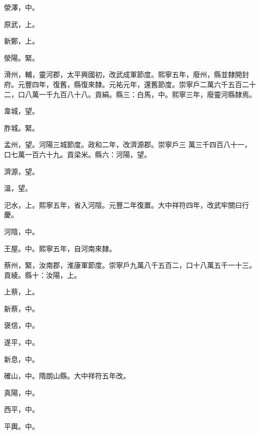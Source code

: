 \begin{pinyinscope}
 滎澤，中。



 原武，上。



 新鄭，上。



 滎陽。緊。



 滑州，輔，靈河郡，太平興國初，改武成軍節度。熙寧五年，廢州，縣並隸開封府。元豐四年，復舊，縣復來隸。元祐元年，還舊節度。崇寧戶二萬六千五百二十二，口八萬一千九百八十八。貢絹。縣三：白馬，中。熙寧三年，廢靈河縣隸焉。



 韋城，望。



 胙城。緊。



 孟州，望。河陽三城節度。政和二年，改濟源郡。崇寧戶三
 萬三千四百八十一，口七萬一百六十九。貢梁米。縣六：河陽，望。



 濟源，望。



 溫，望。



 汜水，上。熙寧五年，省入河陰。元豐二年復置。大中祥符四年，改武牢關曰行慶。



 河陰，中。



 王屋。中。熙寧五年，自河南來隸。



 蔡州，緊，汝南郡，淮康軍節度。崇寧戶九萬八千五百二，口十八萬五千一十三。貢綾。縣十：汝陽，上。



 上蔡，上。



 新蔡，中。



 褒信，中。



 遂平，中。



 新息，中。



 確山，中。隋朗山縣。大中祥符五年改。



 真陽，中。



 西平，中。



 平輿。中。




\end{pinyinscope}
